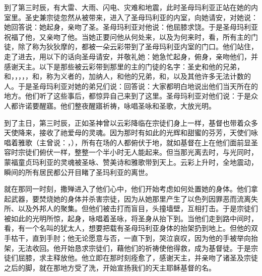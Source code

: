 到了第三时辰，有大雷、大雨、闪电、灾难和地震，此时圣母玛利亚正站在她的内室里。圣史兼宗徒忽然从被带来，进入了圣母玛利亚的内室，向她请安，对她说：她回答说：她起身，亲吻了圣。圣母玛利亚对他说：他屈膝求饶。于是圣母玛利亚祝福了他，又亲吻了他。当她正要问他从何处来，以及为何来时，看，所有主的门徒，除了称为狄狄摩的，都被一朵云彩带到了圣母玛利亚内室的门口。他们站住，走了进去，用以下的话向圣母请安，并敬礼她：她急忙起身，俯身，亲吻他们，并感谢天主。以下是那些被云彩带到那里的主的门徒的名字：圣史和他的兄弟，和，，，，，和，称为义者的，加纳人，和他的兄弟，和，以及其他许多无法计数的人。于是圣母玛利亚对她的弟兄们说：回答说：大家都明白地说出他们当天所在的地方。他们听了这些事后，都惊异自己来到了这里。圣母玛利亚对他们说：于是众人都许诺要醒寤。他们整夜醒寤祈祷，咏唱圣咏和圣歌，大放光明。\par

到了主日，第三时辰，正如圣神曾以云彩降临在宗徒们身上一样，基督也带着众多天使降来，接收了祂爱母的灵魂。因为那时有如此的光辉和甜蜜的芬芳，天使们咏唱着雅歌（主曾说：，），所有在场的人都俯伏于地，就如基督在上在他们面前显圣容时宗徒们俯伏一样，整整一个半小时无人能起来。但当那光离去时，与光同时，蒙福童贞玛利亚的灵魂被圣咏、赞美诗和雅歌带到天上。云彩上升时，全地震动，瞬间的所有居民都公开目睹了圣玛利亚的离世。\par

就在那同一时刻，撒殚进入了他们心中，他们开始考虑如何处置她的身体。他们拿起武器，要焚烧她的身体并杀害宗徒，因为从她那里产生了以色列因罪恶而流离失所、以及外邦人的聚集。但他们被击打而盲目，头撞墙壁，互相打击。于是宗徒们被如此的光明所惊，起身，咏唱着圣咏，将圣身从抬下到。当他们走到路中间时，看，有一个名叫的犹太人，想要把载有圣母玛利亚身体的抬架扔到地上。但他的双手枯干，直到手肘；他无论愿意与否，一直下到，哭泣哀叹，因为他的手被举向抬架，无法收回。他开始恳求宗徒们，藉他们的祈祷使他得救，成为基督徒。于是宗徒们屈膝，求主释放他。他立即在那时刻痊愈了，感谢天主，并亲吻了诸圣及宗徒之后的脚，就在那地方受了洗，开始宣扬我们的天主耶稣基督的名。\par

